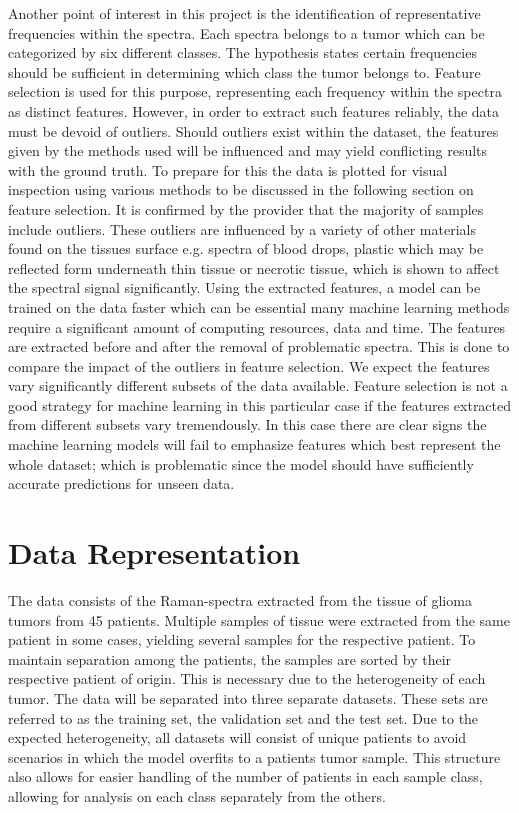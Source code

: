Another point of interest in this project is the identification of representative frequencies within the spectra. Each spectra belongs to a tumor which can be categorized by six different classes. The hypothesis states certain frequencies should be sufficient in determining which class the tumor belongs to. Feature selection is used for this purpose, representing each frequency within the spectra as distinct features. However, in order to extract such features reliably, the data must be devoid of outliers. Should outliers exist within the dataset, the features given by the methods used will be influenced and may yield conflicting results with the ground truth. To prepare for this the data is plotted for visual inspection using various methods to be discussed in the following section on feature selection. It is confirmed by the provider that the majority of samples include outliers. These outliers are influenced by a variety of other materials found on the tissues surface e.g. spectra of blood drops, plastic which may be reflected form underneath thin tissue or necrotic tissue, which is shown to affect the spectral signal significantly. Using the extracted features, a model can be trained on the data faster which can be essential many machine learning methods require a significant amount of computing resources, data and time. The features are extracted before and after the removal of problematic spectra. This is done to compare the impact of the outliers in feature selection. We expect the features vary significantly different subsets of the data available. Feature selection is not a good strategy for machine learning in this particular case if the features extracted from different subsets vary tremendously. In this case there are clear signs the machine learning models will fail to emphasize features which best represent the whole dataset; which is problematic since the model should have sufficiently accurate predictions for unseen data. 


\section{Data Representation}
The data consists of the Raman-spectra extracted from the tissue of glioma tumors from 45 patients. Multiple samples of tissue were extracted from the same patient in some cases, yielding several samples for the respective patient. To maintain separation among the patients, the samples are sorted by their respective patient of origin. This is necessary due to the heterogeneity of each tumor. The data will be separated into three separate datasets. These sets are referred to as the training set, the validation set and the test set. Due to the expected heterogeneity, all datasets will consist of unique patients to avoid scenarios in which the model overfits to a patients tumor sample. This structure also allows for easier handling of the number of patients in each sample class, allowing for analysis on each class separately from the others.

